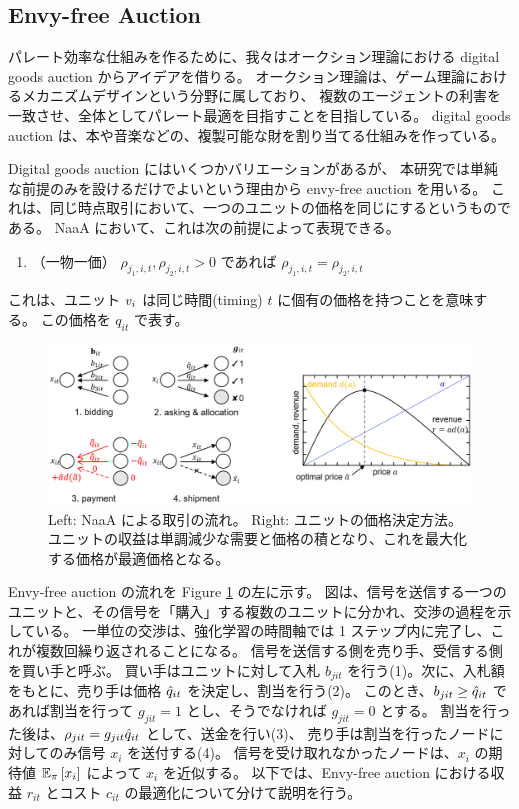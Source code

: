 \subsection{Envy-free Auction}
パレート効率な仕組みを作るために、我々はオークション理論における digital goods auction からアイデアを借りる。
オークション理論は、ゲーム理論におけるメカニズムデザインという分野に属しており、
複数のエージェントの利害を一致させ、全体としてパレート最適を目指すことを目指している。
digital goods auction は、本や音楽などの、複製可能な財を割り当てる仕組みを作っている。

Digital goods auction にはいくつかバリエーションがあるが、
本研究では単純な前提のみを設けるだけでよいという理由から envy-free auction \citep{guruswami2005profit} を用いる。
これは、同じ時点取引において、一つのユニットの価格を同じにするというものである。
NaaA において、これは次の前提によって表現できる。
\begin{enumerate}
\renewcommand{\labelenumi}{N\arabic{enumi}:}
\setcounter{enumi}{4}
\item （一物一価）
	$\rho_{j_1,i,t}, \rho_{j_2,i,t} > 0$ であれば $\rho_{j_1,i,t} = \rho_{j_2,i,t}$ 
\end{enumerate}
これは、ユニット $v_{i}$ は同じ時間(timing) $t$ に個有の価格を持つことを意味する。
この価格を $q_{it}$ で表す。

\begin{figure}[t]
\centering
\includegraphics[width=\linewidth]{img/double.eps}
\caption{
Left: NaaA による取引の流れ。
Right: ユニットの価格決定方法。ユニットの収益は単調減少な需要と価格の積となり、これを最大化する価格が最適価格となる。
}
\label{fig:double}
\end{figure}

Envy-free auction の流れを Figure \ref{fig:double} の左に示す。
図は、信号を送信する一つのユニットと、その信号を「購入」する複数のユニットに分かれ、交渉の過程を示している。
一単位の交渉は、強化学習の時間軸では 1 ステップ内に完了し、これが複数回繰り返されることになる。
信号を送信する側を売り手、受信する側を買い手と呼ぶ。
買い手はユニットに対して入札 $b_{jit}$ を行う(1)。次に、入札額をもとに、売り手は価格 ${\hat{q}}_{it}$ を決定し、割当を行う(2)。
このとき、$b_{jit} \ge {\hat{q}}_{it}$ であれば割当を行って $g_{jit} = 1$ とし、そうでなければ $g_{jit} = 0$ とする。
割当を行った後は、$\rho_{jit} = g_{jit} {\hat{q}}_{it}$ として、送金を行い(3)、
売り手は割当を行ったノードに対してのみ信号 $x_i$ を送付する(4)。
信号を受け取れなかったノードは、$x_i$ の期待値 $\mathbb{E}_{\pi}\left[ x_i \right]$ によって $x_i$ を近似する。
以下では、Envy-free auction における収益 $r_{it}$ とコスト $c_{it}$ の最適化について分けて説明を行う。

